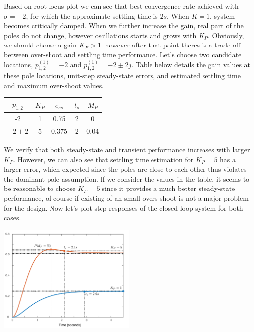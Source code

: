 \documentclass[twoside]{article}
\begin{document}
\vspace{12 pt}

Based on root-locus plot we can see that best convergence rate 
achieved with $\sigma = -2$, for which the approximate settling time
is $2 s.$ When $K = 1$, system becomes critically damped. When we
further increase the gain, real part of the poles do not change,
however oscillations starts and grows with $K_P$. Obviously, we
should choose a gain $K_P > 1$, however after that point
theres is a trade-off between over-shoot and settling time
performance. Let's choose two candidate locations, $p_{1,2}^{(1)} = -2$
and $p_{1,2}^{(1)} = -2 \pm 2 j$. Table below details
the gain values at these pole locations, unit-step steady-state errors,
and estimated settling time and maximum over-shoot values. 

\vspace{6pt}
\begin{minipage}[h]{1\linewidth}
\begin{center}
\begin{tabular}{|c | c | c | c | c  |}
\hline
$p_{1,2}$ & $K_P$ & $e_{ss}$ & $t_s$ & $M_P$
\\ \hline
-2 & 1 & 0.75 & 2 & 0
\\ \hline
$-2 \pm 2 $  & 5 & 0.375 & 2 & 0.04
\\ \hline
\end{tabular}
\end{center}
\end{minipage}
\vspace{6pt}

We verify that both steady-state and transient performance increases
with larger $K_P$. However, we can also see that settling time
estimation for $K_P = 5$ has a larger error, which expected
since the poles are close to each other thus violates the
dominant pole assumption. If we consider the values in the table, 
it seems to be reasonable to choose $K_P = 5$ since it provides a
much better steady-state performance, of course if existing
of an small overs-shoot is not a major problem for the design.
Now let's plot step-responses of the closed loop system for
both cases. 

\vspace{12 pt}

  \begin{minipage}[h]{1\linewidth}
    \begin{center}
      \includegraphics[width=0.5\textwidth]{Pcont}
    \end{center}
  \end{minipage}
\end{document}
